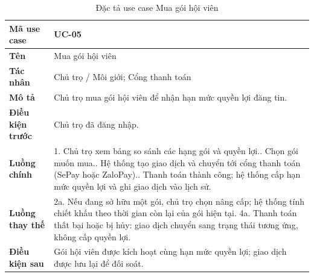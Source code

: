 \begin{table}[!ht]
\centering
\caption{Đặc tả use case Mua gói hội viên}
\label{tab:uc-membership}
\begin{tabular}{p{} p{}}
\hline
\textbf{Mã use case} & UC-05 \\
\hline
\textbf{Tên} & Mua gói hội viên \\
\hline
\textbf{Tác nhân} & Chủ trọ / Môi giới; Cổng thanh toán \\
\hline
\textbf{Mô tả} & Chủ trọ mua gói hội viên để nhận hạn mức quyền lợi đăng tin. \\
\hline
\textbf{Điều kiện trước} & Chủ trọ đã đăng nhập. \\
\hline
\textbf{Luồng chính} & 1. Chủ trọ xem bảng so sánh các hạng gói và quyền lợi.\newline
2. Chọn gói muốn mua.\newline
3. Hệ thống tạo giao dịch và chuyển tới cổng thanh toán (SePay hoặc ZaloPay).\newline
4. Thanh toán thành công; hệ thống cấp hạn mức quyền lợi và ghi giao dịch vào lịch sử. \\
\hline
\textbf{Luồng thay thế} & 2a. Nếu đang sở hữu một gói, chủ trọ chọn nâng cấp; hệ thống tính chiết khấu theo thời gian còn lại của gói hiện tại.\newline
4a. Thanh toán thất bại hoặc bị hủy: giao dịch chuyển sang trạng thái tương ứng, không cấp quyền lợi. \\
\hline
\textbf{Điều kiện sau} & Gói hội viên được kích hoạt cùng hạn mức quyền lợi; giao dịch được lưu lại để đối soát. \\
\hline
\end{tabular}
\end{table}

